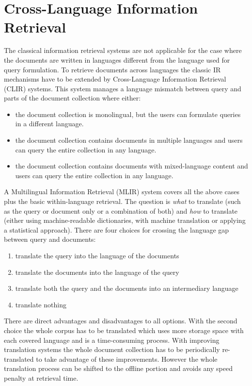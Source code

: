 \documentclass[journal]{IEEEtran}
\begin{document}
\section{Cross-Language Information Retrieval}
\label{sec:clir}
The classical information retrieval systems are not applicable for the case where the documents are written in languages different from the language used for query formulation.
To retrieve documents across languages the classic IR mechanisms have to be extended by Cross-Language Information Retrieval (CLIR) systems.
This system manages a language mismatch between query and parts of the document collection where either:
\begin{itemize}
	\item the document collection is monolingual, but the users can formulate queries in a different language.
	\item the document collection contains documents in multiple languages and users can query the entire collection in any language.
	\item the document collection contains documents with mixed-language content and users can query the entire collection in any language.
\end{itemize}
A Multilingual Information Retrieval (MLIR) system covers all the above cases plus the basic within-language retrieval.
The question is \textit{what} to translate (such as the query or document only or a combination of both) and \textit{how} to translate (either using machine-readable dictionaries, with machine translation or applying a statistical approach).
There are four choices for crossing the language gap between query and documents:
\begin{enumerate}
	\item translate the query into the language of the documents
	\item translate the documents into the language of the query
	\item translate both the query and the documents into an intermediary language
	\item translate nothing
\end{enumerate}
There are direct advantages and disadvantages to all options.
With the second choice the whole corpus has to be translated which uses more storage space with each covered language and is a time-consuming process.
With improving translation systems the whole document collection has to be periodically re-translated to take advantage of these improvements.
However the whole translation process can be shifted to the offline portion and avoids any speed penalty at retrieval time.
\end{document}
